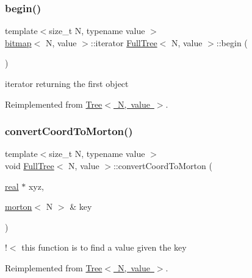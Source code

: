 \mbox{\label{classFullTree_af2fbecbd352a329634a6fdc35f519968}} 
\subsubsection{\texorpdfstring{begin()}{begin()}}
{\footnotesize\ttfamily template$<$size\+\_\+t N, typename value $>$ \\
\mbox{\hyperlink{definitions_8h_acf2396ef4de9eb8a6324b9f1a624ea85}{bitmap}}$<$ N, value $>$\+::iterator \mbox{\hyperlink{classFullTree}{Full\+Tree}}$<$ N, value $>$\+::begin (\begin{DoxyParamCaption}{ }\end{DoxyParamCaption})\hspace{0.3cm}{\ttfamily [virtual]}}

iterator returning the first object 

Reimplemented from \mbox{\hyperlink{classTree_aa9a32f0e006ee027c037669b8b1c7d01}{Tree$<$ N, value $>$}}.

\mbox{\label{classFullTree_a1b0a9b6f0f5155dd8847905ee8aa1b56}} 
\subsubsection{\texorpdfstring{convert\+Coord\+To\+Morton()}{convertCoordToMorton()}}
{\footnotesize\ttfamily template$<$size\+\_\+t N, typename value $>$ \\
void \mbox{\hyperlink{classFullTree}{Full\+Tree}}$<$ N, value $>$\+::convert\+Coord\+To\+Morton (\begin{DoxyParamCaption}\item[{\mbox{\hyperlink{definitions_8h_aedc0ad84d1e764530814f57ad931d02a}{real}} $\ast$}]{xyz,  }\item[{\mbox{\hyperlink{definitions_8h_af8682350bd8bb38ee9023f7a0a310add}{morton}}$<$ N $>$ \&}]{key }\end{DoxyParamCaption})\hspace{0.3cm}{\ttfamily [virtual]}}

!$<$ this function is to find a value given the key 

Reimplemented from \mbox{\hyperlink{classTree_a945d137d27bb55d9feb5762ac821572a}{Tree$<$ N, value $>$}}.

